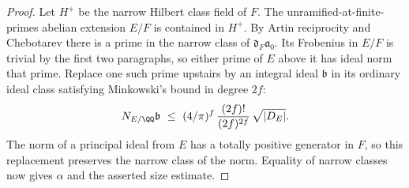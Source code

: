 \documentclass[a4paper,11pt]{article}
\theoremstyle{definition}
\theoremstyle{remark}
\numberwithin{equation}{section}
\begin{document}
\begin{proof}
Let \(H^+\) be the narrow Hilbert class field of \(F\).
The unramified-at-finite-primes abelian extension \(E/F\)
is contained in \(H^+\). By Artin reciprocity and Chebotarev
there is a prime in the narrow class of
\(\mathfrak d_F\mathfrak a_0\). Its Frobenius in \(E/F\)
is trivial by the first two paragraphs, so either prime of
\(E\) above it has ideal norm that prime. Replace one such
prime upstairs by an integral ideal \(\mathfrak b\) in its
ordinary ideal class satisfying Minkowski's bound in degree
\(2f\):
\[
 N_{E/\QQ}\mathfrak b\ \le\
  (4/\pi)^f\,\frac{(2f)!}{(2f)^{2f}}\,\sqrt{|D_E|}.
\]
The norm of a principal ideal from \(E\) has a totally
positive generator in \(F\), so this replacement preserves
the narrow class of the norm. Equality of narrow classes
now gives \(\alpha\) and the asserted size estimate.
\end{proof}
\end{document}
